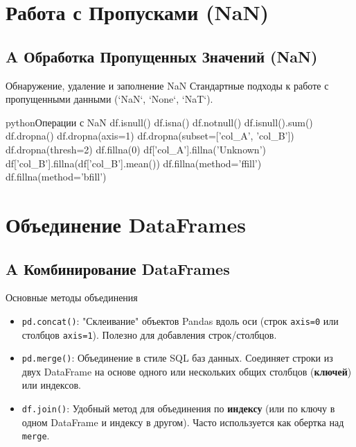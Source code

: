 \section{Работа с Пропусками (NaN)}

\subsection{A Обработка Пропущенных Значений (NaN)}

\begin{myblock}{{Обнаружение, удаление и заполнение NaN}}
    Стандартные подходы к работе с пропущенными данными (`NaN`, `None`, `NaT`).
    \begin{codebox}{python}{Операции с NaN}
    df.isnull()
    df.isna()
    df.notnull()
    df.isnull().sum()
    df.dropna()
    df.dropna(axis=1)
    df.dropna(subset=['col_A', 'col_B'])
    df.dropna(thresh=2)
    df.fillna(0)
    df['col_A'].fillna('Unknown')
    df['col_B'].fillna(df['col_B'].mean())
    df.fillna(method='ffill')
    df.fillna(method='bfill')
    \end{codebox}
\end{myblock}

\section{Объединение DataFrames}

\subsection{A Комбинирование DataFrames}

\begin{textbox}{Основные методы объединения}
    \begin{itemize}[nosep, leftmargin=*]
        \item \texttt{pd.concat()}: "Склеивание" объектов Pandas вдоль оси (строк \texttt{axis=0} или столбцов \texttt{axis=1}). Полезно для добавления строк/столбцов.
        \item \texttt{pd.merge()}: Объединение в стиле SQL баз данных. Соединяет строки из двух DataFrame на основе одного или нескольких общих столбцов (\textbf{ключей}) или индексов.
        \item \texttt{df.join()}: Удобный метод для объединения по \textbf{индексу} (или по ключу в одном DataFrame и индексу в другом). Часто используется как обертка над \texttt{merge}.
    \end{itemize}
\end{textbox}

